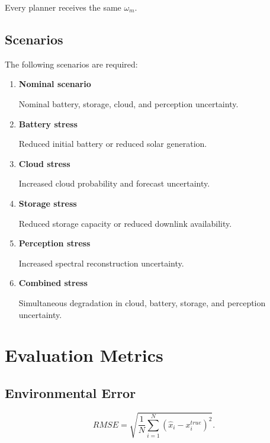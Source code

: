 \documentclass[11pt,a4paper]{article}
\begin{document}
Every planner receives the same $\omega_m$.

\subsection{Scenarios}

The following scenarios are required:

\begin{enumerate}[leftmargin=*]

\item \textbf{Nominal scenario}

Nominal battery, storage, cloud, and perception uncertainty.

\item \textbf{Battery stress}

Reduced initial battery or reduced solar generation.

\item \textbf{Cloud stress}

Increased cloud probability and forecast uncertainty.

\item \textbf{Storage stress}

Reduced storage capacity or reduced downlink availability.

\item \textbf{Perception stress}

Increased spectral reconstruction uncertainty.

\item \textbf{Combined stress}

Simultaneous degradation in cloud, battery, storage, and perception
uncertainty.

\end{enumerate}


\section{Evaluation Metrics}

\subsection{Environmental Error}

\begin{equation}
RMSE
=
\sqrt{
\frac{1}{N}
\sum_{i=1}^{N}
(\hat x_i-x_i^{true})^2
}.
\end{equation}
\end{document}

